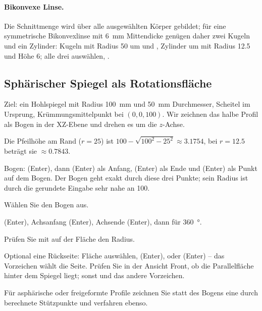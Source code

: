 \paragraph{Bikonvexe Linse.} Die Schnittmenge wird über alle ausgewählten Körper gebildet; für
eine symmetrische Bikonvexlinse mit \SI{6}{mm} Mittendicke genügen daher zwei Kugeln und ein
Zylinder: Kugeln mit Radius 50 um  und , Zylinder um
 mit Radius 12.5 und Höhe 6; alle drei auswählen, .

\subsection{Sphärischer Spiegel als Rotationsfläche}\label{sec:bsp-spiegel}

Ziel: ein Hohlspiegel mit Radius \SI{100}{mm} und \SI{50}{mm} Durchmesser, Scheitel im
Ursprung, Krümmungsmittelpunkt bei $(0,0,100)$. Wir zeichnen das halbe Profil als Bogen in der
XZ-Ebene und drehen es um die $z$-Achse.

Die Pfeilhöhe am Rand ($r=25$) ist $100 - \sqrt{100^2 - 25^2} \approx \num{3.1754}$, bei $r =
12.5$ beträgt sie $\approx \num{0.7843}$.

\begin{schritte}
\item Bogen:  (Enter), dann  (Enter) als Anfang, 
  (Enter) als Ende und  (Enter) als Punkt auf dem Bogen. Der Bogen geht
  exakt durch diese drei Punkte; sein Radius ist durch die gerundete Eingabe sehr nahe an 100.
\item Wählen Sie den Bogen aus.
\item {} (Enter), Achsanfang  (Enter), Achsende  (Enter),
  dann  für \SI{360}{\degree}.
\item Prüfen Sie mit  auf der Fläche den Radius.
\item Optional eine Rückseite: Fläche auswählen,  (Enter),  oder
   (Enter) -- das Vorzeichen wählt die Seite. Prüfen Sie in der Ansicht Front, ob die
  Parallelfläche hinter dem Spiegel liegt; sonst  und das andere Vorzeichen.
\end{schritte}

Für asphärische oder freigeformte Profile zeichnen Sie statt des Bogens eine
 durch berechnete Stützpunkte und verfahren ebenso.

